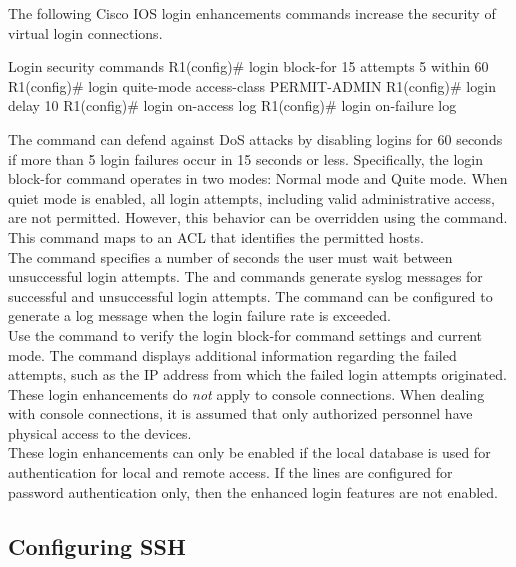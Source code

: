 The following Cisco IOS login enhancements commands increase the security of virtual login connections.

\begin{sexylisting}{Login security commands}
R1(config)# login block-for 15 attempts 5 within 60
R1(config)# login quite-mode access-class PERMIT-ADMIN
R1(config)# login delay 10
R1(config)# login on-access log
R1(config)# login on-failure log
\end{sexylisting}

The  command can defend against DoS attacks by disabling logins for 60 seconds if more than 5 login failures occur in 15 seconds or less. Specifically, the login block-for command operates in two modes: Normal mode and Quite mode. When quiet mode is enabled, all login attempts, including valid administrative access, are not permitted. However, this behavior can be overridden using the  command. This command maps to an ACL that identifies the permitted hosts. \\

The  command specifies a number of seconds the user must wait between unsuccessful login attempts. The  and  commands generate syslog messages for successful and unsuccessful login attempts. The  command can be configured to generate a log message when the login failure rate is exceeded.\\

Use the  command to verify the login block-for command settings and current mode. The  command displays additional information regarding the failed attempts, such as the IP address from which the failed login attempts originated.\\

These login enhancements do \emph{not} apply to console connections. When dealing with console connections, it is assumed that only authorized personnel have physical access to the devices.\\

\note These login enhancements can only be enabled if the local database is used for authentication for local and remote access. If the lines are configured for password authentication only, then the enhanced login features are not enabled.

\subsection{Configuring SSH}

